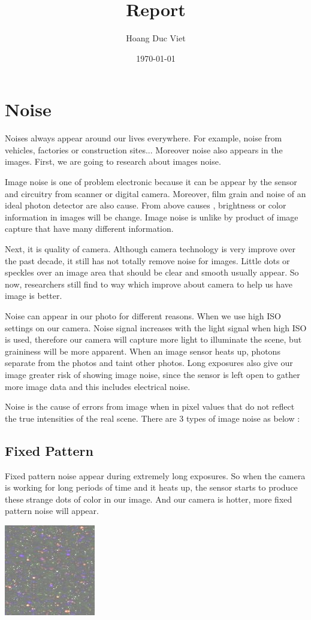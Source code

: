 \documentclass[10pt]{article}
\begin{document}
		\title{Report}
		\author{Hoang Duc Viet}
		\date{\today}
		\maketitle

\newpage
\newpage
\section{Noise}
Noises always appear around our lives everywhere. For example, noise from vehicles, factories or construction sites... Moreover noise also appears in the images. First, we are going to research about images noise.

Image noise is one of problem electronic because it can be appear by the sensor and circuitry from scanner or digital camera. Moreover, film grain and noise of an ideal photon detector are also cause. From above causes , brightness or color information in images will be change. Image noise is unlike by product of image capture that have many different information.

Next, it is quality of camera. Although camera technology is very improve over the past decade, it still has not totally remove noise for images. Little dots or speckles over an image area that should be clear and smooth usually appear. So now, researchers still find to way which improve about camera to help us have image is better.   


Noise can appear in our photo for different reasons. When we use high ISO settings on our camera. Noise signal increases with the light signal when high ISO is used, therefore our camera will capture more light to illuminate the scene, but graininess will be more apparent. When an image sensor heats up, photons separate from the photos and taint other photos. Long exposures also give our image greater risk of showing image noise, since the sensor is left open to gather more image data and this includes electrical noise.

Noise is the cause of errors from image when in pixel values that do not reflect the true intensities of the real scene. There are 3 types of image noise as below :

\subsection{Fixed Pattern}
Fixed pattern noise appear during extremely long exposures. So when the camera is working for long periods of time and it heats up, the sensor starts to produce these strange dots of color in our image. And our camera is hotter, more fixed pattern noise will appear.
\begin{center}
	\includegraphics{fix.png}
\end{center}
\end{document}

